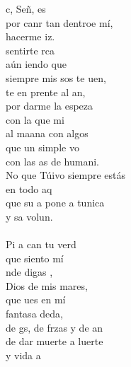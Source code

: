 \begin{cancion}%
	c, Señ,  es \\
	por canr tan dentroe mí,\\
	 hacerme iz.\\
	 sentirte rca\\
	aún iendo que\\
	siempre mis sos te uen,\\
	te en prente al an,\\
	por darme la espeza  \\
	con la que mi \\
	al maana con algos \\
	que un simple vo\\
	con las as de humani.\\
	No que Túivo siempre estás\\
	en todo aq\\
	que su a pone a tunica\\
	y sa volun.\\
	\jump\\
	Pi a can tu verd \\
	que siento  mí\\
	nde digas ,\\
	Dios de mis mares,\\
	que ues en mí\\
	 fantasa deda,\\
	de gs, de frzas y de an\\
	de dar muerte a luerte \\
	y vida a \\

\end{cancion}

